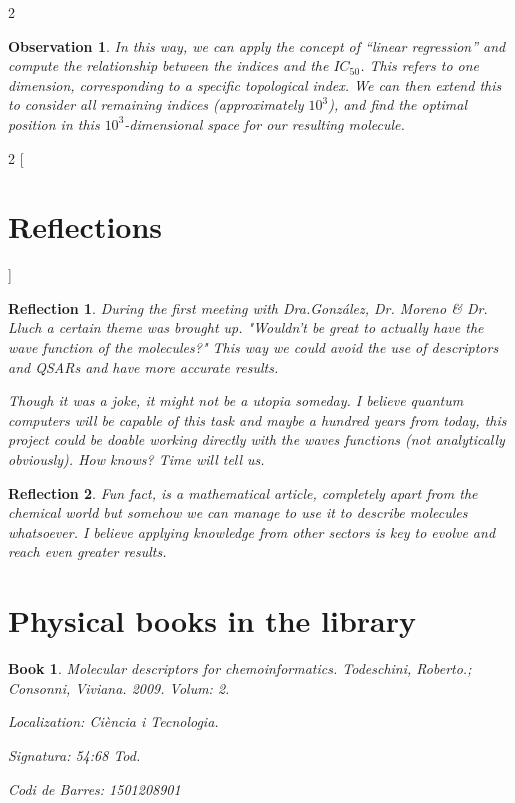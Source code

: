\documentclass[12pt,letterpaper]{article}
\newtheorem{observation}{Observation}
\newtheorem{reflection}{Reflection}
\newtheorem{book}{Book}
\begin{document}
\begin{multicols}{2}
\begin{observation}
In this way, we can apply the concept of “linear regression” and compute the relationship between the indices and the $IC_{50}$. This refers to one dimension, corresponding to a specific topological index. We can then extend this to consider all remaining indices (approximately $10^3$), and find the optimal position in this $10^3$-dimensional space for our resulting molecule.
\end{observation}
\end{multicols}
\newpage


\begin{multicols}{2}
[
\section{Reflections}
]
\begin{reflection}
During the first meeting with Dra.González, Dr. Moreno \& Dr. Lluch a certain theme was brought up. "Wouldn't be great to actually have the wave function of the molecules?" This way we could avoid the use of descriptors and QSARs and have more accurate results. \par
Though it was a joke, it might not be a utopia someday. I believe quantum computers will be capable of this task and maybe a hundred years from today, this project could be doable working directly with the waves functions (not analytically obviously). How knows? Time will tell us.
\end{reflection}
\begin{reflection}
Fun fact, \cite{ZagrebIndicesArticle} is a mathematical article, completely apart from the chemical world but somehow we can manage to use it to describe molecules whatsoever. I believe applying knowledge from other sectors is key to evolve and reach even greater results.
\end{reflection}
\end{multicols}

\newpage


\section{Physical books in the library}
\begin{book}
Molecular descriptors for chemoinformatics. Todeschini, Roberto.; Consonni, Viviana. 2009. Volum: 2. 

Localization: Ciència i Tecnologia. 

Signatura: 54:68 Tod. 

Codi de Barres: 1501208901
\end{book}

\newpage


% 
 
\end{document}
